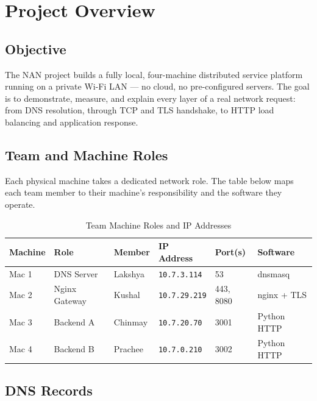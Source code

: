 \documentclass[12pt,a4paper]{article}
\begin{document}
\section{Project Overview}

\subsection{Objective}

The NAN project builds a fully local, four-machine distributed service platform running on a private Wi-Fi LAN --- no cloud, no pre-configured servers. The goal is to demonstrate, measure, and explain every layer of a real network request: from DNS resolution, through TCP and TLS handshake, to HTTP load balancing and application response.

\subsection{Team and Machine Roles}

Each physical machine takes a dedicated network role. The table below maps each team member to their machine's responsibility and the software they operate.

\begin{table}[h!]
\centering
\caption{Team Machine Roles and IP Addresses}
\begin{tabular}{llllll}
\toprule
\textbf{Machine} & \textbf{Role} & \textbf{Member} & \textbf{IP Address} & \textbf{Port(s)} & \textbf{Software} \\
\midrule
Mac 1 & DNS Server & Lakshya & \texttt{10.7.3.114} & 53 & dnsmasq \\
Mac 2 & Nginx Gateway & Kushal & \texttt{10.7.29.219} & 443, 8080 & nginx + TLS \\
Mac 3 & Backend A & Chinmay & \texttt{10.7.20.70} & 3001 & Python HTTP \\
Mac 4 & Backend B & Prachee & \texttt{10.7.0.210} & 3002 & Python HTTP \\
\bottomrule
\end{tabular}
\end{table}

\subsection{DNS Records}
\end{document}
